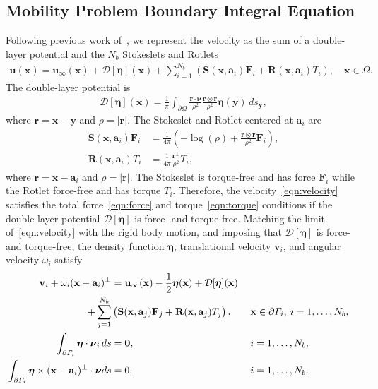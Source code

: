 \documentclass[lineno]{jfm}
\renewcommand{\aa}{\mathbf{a}}
\newcommand{\bd}{\partial}
\newcommand{\DD}{\mathcal{D}}
\newcommand{\eeta}{\boldsymbol{\eta}}
\newcommand{\FF}{\mathbf{F}}
\newcommand{\nnu}{\boldsymbol{\nu}}
\newcommand{\rr}{\mathbf{r}}
\newcommand{\RR}{\mathbf{R}}
\renewcommand{\SS}{\mathbf{S}}
\newcommand{\xx}{\mathbf{x}}
\newcommand{\uu}{\mathbf{u}}
\renewcommand{\vv}{\mathbf{v}}
\newcommand{\yy}{\mathbf{y}}
\begin{document}
\subsection{Mobility Problem Boundary Integral Equation}
Following previous work of~\cite{Lukas19}, we represent the velocity as
the sum of a double-layer potential and the $N_b$ Stokeslets and Rotlets
\begin{align}
  \label{eqn:velocity}
  \uu(\xx) = \uu_\infty(\xx) + \DD[\eeta](\xx) + 
    \sum_{i=1}^{N_b} \left(\SS(\xx,\aa_i) \FF_i + 
    \RR(\xx,\aa_i) T_i\right), \quad \xx \in \Omega.
\end{align}
The double-layer potential is
\begin{align}
  \DD[\eeta](\xx) = \frac{1}{\pi} \int_{\bd\Omega} 
    \frac{\rr \cdot \nnu}{\rho^2} \frac{\rr \otimes \rr}{\rho^2}
    \eeta(\yy) \, ds_\yy,
\end{align}
where $\rr = \xx - \yy$ and $\rho = |\rr|$. The Stokeslet and Rotlet
centered at $\aa_i$ are
\begin{align}
  \SS(\xx,\aa_i)\FF_i &= \frac{1}{4\pi} \left(-\log(\rho) + 
    \frac{\rr \otimes \rr}{\rho^2} \FF_i \right), \\
  \RR(\xx,\aa_i)T_i &= \frac{1}{4\pi} \frac{\rr^\perp}{\rho^2} T_i,
\end{align}
where $\rr = \xx - \aa_i$ and $\rho = |\rr|$. The Stokeslet is
torque-free and has force $\FF_i$ while the Rotlet force-free and has
torque $T_i$. Therefore, the velocity~\eqref{eqn:velocity} satisfies the
total force~\eqref{eqn:force} and torque~\eqref{eqn:torque} conditions
if the double-layer potential $\DD[\eeta]$ is force- and torque-free.
Matching the limit of~\eqref{eqn:velocity} with the rigid body motion,
and imposing that $\DD[\eeta]$ is force- and torque-free, the density
function $\eeta$, translational velocity $\vv_i$, and angular velocity
$\omega_i$ satisfy
\begin{alignat}{3}
  \nonumber
  \vv_i + \omega_i (\xx - \aa_i)^\perp &= \uu_\infty(\xx)
    -\frac{1}{2} \eeta(\xx) + \DD[\eeta](\xx) \\
  \label{eqn:SKIE}
    + \sum_{j=1}^{N_b} &
    \left(\SS(\xx,\aa_j) \FF_j + \RR(\xx,\aa_j) T_j\right),
    \quad &&\xx \in \bd \Gamma_i,\: i=1,\ldots,N_b, \\
  \label{eqn:mobility1}
  \int_{\bd\Gamma_i} \eeta \cdot \nnu_i \, ds &= {\bf 0}, 
  &&i = 1,\ldots,N_b, \\
  \label{eqn:mobility2}
  \int_{\bd\Gamma_i} \eeta\times(\xx-\aa_i)^\perp \cdot \nnu ds &= 0,
  &&i = 1,\ldots,N_b.
\end{alignat}
\end{document}
